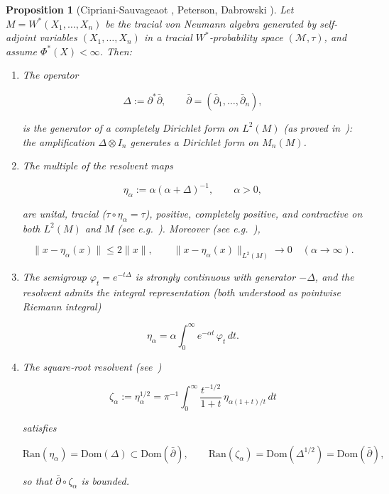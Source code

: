 \documentclass[10pt,a4paper,reqno]{amsart}
\newtheorem{proposition}[theorem]{Proposition}
\newcommand{\Dom}{\mathrm{Dom}}
\begin{document}
\begin{proposition}[Cipriani-Sauvageaot \cite{Sauvage,CiprianiSauvageot2003}, Peterson\cite{Peterson}, Dabrowski \cite{Dab10}]\label{resolvent}
Let $M=W^\ast(X_1,\ldots,X_n)$ be the tracial von Neumann algebra generated by
self-adjoint variables $(X_1,\ldots,X_n)$ in a tracial $W^\ast$‑probability
space $(\mathcal{M},\tau)$, and assume $\Phi^\ast(X)<\infty$. Then:

\begin{enumerate}
  \item The operator
  

\[
     \Delta := \partial^\ast\bar{\partial},
     \qquad \bar{\partial}=(\bar{\partial}_1,\ldots,\bar{\partial}_n),
  \]


  is the generator of a completely Dirichlet form on $L^2(M)$ (as proved in~\cite{Sauvage}):
  \newline
the amplification $\Delta\otimes I_n$ generates a Dirichlet form on
  $M_n(M)$.

  \item The multiple of the resolvent maps
  

\[
     \eta_\alpha := \alpha(\alpha+\Delta)^{-1},\qquad \alpha>0,
  \]


  are unital, tracial ($\tau\circ\eta_\alpha=\tau$), positive, completely
  positive, and contractive on both $L^2(M)$ and $M$ (see e.g.~\cite{Ma}).  Moreover (see e.g.~\cite[Proposition~2.5]{CiprianiSauvageot2003}),
  

\[
     \|x-\eta_\alpha(x)\|\le 2\|x\|,
     \qquad
     \|x-\eta_\alpha(x)\|_{L^2(M)}\longrightarrow 0
     \quad (\alpha\to\infty).
  \]



  \item The semigroup $\varphi_t=e^{-t\Delta}$ is strongly continuous with
  generator $-\Delta$, and the resolvent admits the integral representation (both understood as pointwise Riemann integral)
  

\[
     \eta_\alpha
     = \alpha\int_0^\infty e^{-\alpha t}\,\varphi_t\,dt.
  \]



  \item The square‑root resolvent (see~\cite{Peterson})
  

\[
     \zeta_\alpha := \eta_\alpha^{1/2}
     = \pi^{-1}\!\int_0^\infty \frac{t^{-1/2}}{1+t}\,
       \eta_{\alpha(1+t)/t}\,dt
  \]


  satisfies
  

\[
     \mathrm{Ran}(\eta_\alpha)=\Dom(\Delta)\subset \Dom(\bar{\partial}),
     \qquad
     \mathrm{Ran}(\zeta_\alpha)=\Dom(\Delta^{1/2})=\Dom(\bar{\partial}),
  \]


  so that $\bar{\partial}\circ\zeta_\alpha$ is bounded.
\end{enumerate}
\end{proposition}
\end{document}
